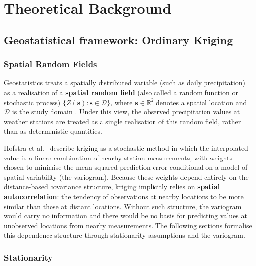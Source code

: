 \chapter{Theoretical Background}
\label{ch:theory}

\section{Geostatistical framework: Ordinary Kriging}
\label{sec:theory-kriging}

\subsection{Spatial Random Fields}
\label{sec:random_fields}

Geostatistics treats a spatially distributed variable (such as daily
precipitation) as a realisation of a \textbf{spatial random field} (also
called a random function or stochastic process) $\{Z(\mathbf{s}) :
\mathbf{s} \in \mathcal{D}\}$, where $\mathbf{s} \in \mathbb{R}^2$ denotes a
spatial location and $\mathcal{D}$ is the study domain
\cite{matheron1963principles, cressie1993}.
Under this view, the observed precipitation values at weather stations are
treated as a single realisation of this random field, rather than as
deterministic quantities.

Hofstra et al.~\cite{hofstra2008comparison} describe kriging as a stochastic method in
which the interpolated value is a linear combination of nearby station
measurements, with weights chosen to minimise the mean squared prediction error
conditional on a model of spatial variability (the variogram).
Because these weights depend entirely on the distance-based covariance
structure, kriging implicitly relies on \textbf{spatial autocorrelation}: the
tendency of observations at nearby locations to be more similar than those at
distant locations.
Without such structure, the variogram would carry no information and there
would be no basis for predicting values at unobserved locations from nearby
measurements.
The following sections formalise this dependence structure through stationarity
assumptions and the variogram.


\subsection{Stationarity}
\label{sec:stationarity}

